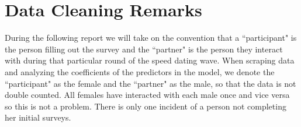 \documentclass{article}
\begin{document}
\section{Data Cleaning Remarks}
During the following report we will take on the convention that a ``participant" is the person filling out the survey and the ``partner" is the person they interact with during that particular round of the speed dating wave.  When scraping data and analyzing the coefficients of the predictors in the model, we denote the ``participant" as the female and the ``partner" as the male, so that the data is not double counted.  All females have interacted with each male once and vice versa so this is not a problem.  There is only one incident of a person not completing her initial surveys.\\
\end{document}
